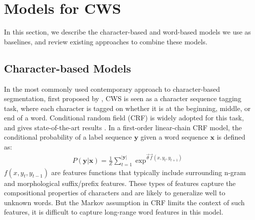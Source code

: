 \section{Models for CWS}

In this section, we describe the character-based and word-based models we use as baselines, and review existing approaches to combine these models.

\subsection{Character-based Models}
In the most commonly used contemporary approach to character-based segmentation, first proposed by \cite{Xue:2003:IJCLCLP}, CWS is seen as a character sequence tagging task, where each character is tagged on whether it is at the beginning, middle, or end of a word. Conditional random field (CRF) \cite{Lafferty:2001:ICML} is widely adopted for this task, and gives state-of-the-art results \cite{Tseng:2005:SIGHAN}. In a first-order linear-chain CRF model, the conditional probability of a label sequence $\mathbf{y}$ given a word sequence $\mathbf{x}$ is defined as:
\begin{align*}
P(\mathbf{y} | \mathbf{x}) = \frac{1}{Z}{ \sum\limits_{t=1}^{|\mathbf{y}|}{ \exp^{ \vec\theta \vec{f}(x, y_{t}, y_{t+1}) } }}
\end{align*}
\noindent $f(x, y_{t}, y_{t-1})$ are features functions that typically include surrounding n-gram and morphological suffix/prefix features. These types of features capture the compositional properties of characters and are likely to generalize well to unknown words.  
But the Markov assumption in CRF limits the context of such features, it is difficult to capture long-range word features in this model. 

